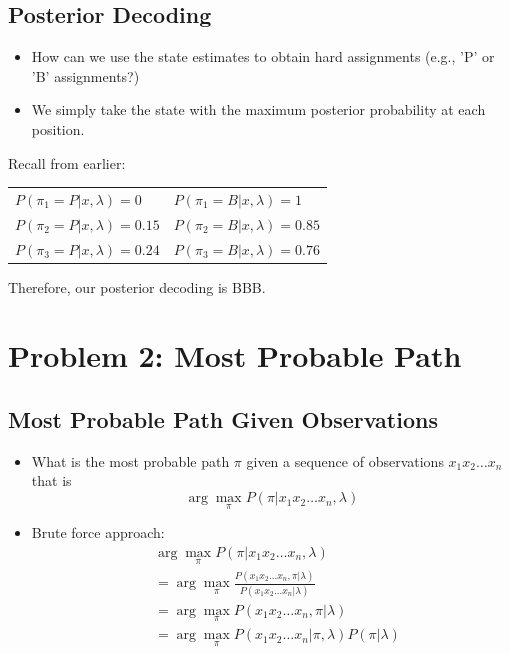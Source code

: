 \documentclass[10pt]{article}
\begin{document}
\subsection*{Posterior Decoding}
\begin{itemize}
	\item How can we use the state estimates to obtain hard assignments (e.g., 'P' or 'B' assignments?)
	\item We simply take the state with the maximum posterior probability at each position.
\end{itemize}
Recall from earlier:
\begin{center}
\begin{tabular}{ll}
    $P(\pi_1 = P|x, \lambda) = 0$ & $P(\pi_1 = B|x, \lambda) = 1$\\
    $P(\pi_2 = P|x, \lambda) = 0.15$ & $P(\pi_2 = B|x, \lambda) = 0.85$\\
    $P(\pi_3 = P|x, \lambda) = 0.24$ & $P(\pi_3 = B|x, \lambda) = 0.76$
\end{tabular}
\end{center}
Therefore, our posterior decoding is BBB.

\section*{Problem 2: Most Probable Path}
\subsection*{Most Probable Path Given Observations}
\begin{itemize}
	\item What is the most probable path $\pi$ given a sequence of observations $x_1 x_2 \dots x_n$ that is
	\[\arg \max_{\pi} P(\pi | x_1 x_2 \dots x_n, \lambda)\]
    \item Brute force approach:
    \begin{align*}
        &\arg \max_{\pi} P(\pi | x_1 x_2 \dots x_n, \lambda)\\
        &= \arg \max_{\pi} \frac{P(x_1 x_2 \dots x_n, \pi | \lambda)}{P(x_1 x_2 \dots x_n | \lambda)}\\
        &= \arg \max_{\pi} P(x_1 x_2 \dots x_n, \pi | \lambda)\\
        &= \arg \max_{\pi} P(x_1 x_2 \dots x_n | \pi, \lambda) P(\pi | \lambda)
    \end{align*}
\end{itemize}
\end{document}

